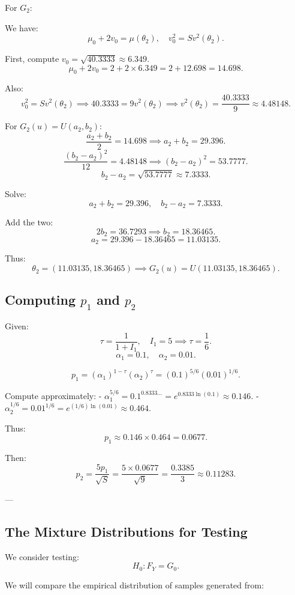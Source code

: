 \documentclass{article}
\begin{document}
For \(G_2 \):

We have:
\[
\mu_0 + 2v_0 = \mu(\theta_2), \quad v_0^2 = S v^2(\theta_2).
\]

First, compute \(v_0 = \sqrt{40.3333} \approx 6.349.\)
\[
\mu_0 + 2v_0 = 2 + 2 \times 6.349 = 2 + 12.698 = 14.698.
\]

Also:
\[
v_0^2 = S v^2(\theta_2) \implies 40.3333 = 9 v^2(\theta_2) \implies v^2(\theta_2) = \frac{40.3333}{9} \approx 4.48148.
\]

For \(G_2(u) = U(a_2,b_2)\):
\[
\frac{a_2 + b_2}{2} = 14.698 \implies a_2 + b_2 = 29.396.
\]
\[
\frac{(b_2 - a_2)^2}{12} = 4.48148 \implies (b_2 - a_2)^2 = 53.7777.
\]
\[
b_2 - a_2 = \sqrt{53.7777} \approx 7.3333.
\]

Solve:
\[
a_2 + b_2 = 29.396, \quad b_2 - a_2 = 7.3333.
\]

Add the two:
\[
2b_2 = 36.7293 \implies b_2 = 18.36465.
\]
\[
a_2 = 29.396 - 18.36465 = 11.03135.
\]

Thus:
\[
\theta_2 = (11.03135, 18.36465) \implies G_2(u) = U(11.03135,18.36465).
\]

\subsection{Computing \( p_1 \) and \( p_2 \)}

Given:
\[
\tau = \frac{1}{1+I_1}, \quad I_1 = 5 \implies \tau = \frac{1}{6}.
\]
\[
\alpha_1 = 0.1, \quad \alpha_2 = 0.01.
\]

\[
p_1 = (\alpha_1)^{1-\tau} (\alpha_2)^\tau = (0.1)^{5/6} (0.01)^{1/6}.
\]

Compute approximately:
- \(\alpha_1^{5/6} = 0.1^{0.8333...} = e^{0.8333 \ln(0.1)} \approx 0.146.\)
- \(\alpha_2^{1/6} = 0.01^{1/6} = e^{(1/6)\ln(0.01)} \approx 0.464.\)

Thus:
\[
p_1 \approx 0.146 \times 0.464 = 0.0677.
\]

Then:
\[
p_2 = \frac{5 p_1}{\sqrt{S}} = \frac{5 \times 0.0677}{\sqrt{9}} = \frac{0.3385}{3} \approx 0.11283.
\]

---

\subsection{The Mixture Distributions for Testing}

We consider testing:
\[
H_0: F_Y = G_0.
\]

We will compare the empirical distribution of samples generated from:
\end{document}
